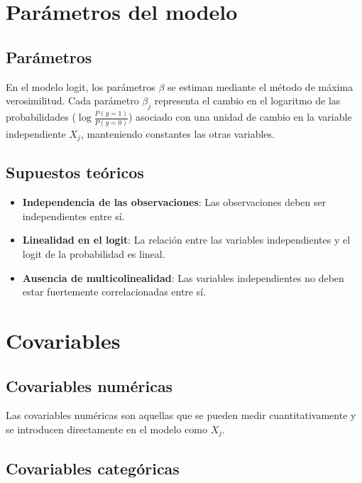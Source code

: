 \documentclass[
  letterpaper,
  DIV=11,
  numbers=noendperiod]{scrreprt}
\providecommand{\tightlist}{%
  \setlength{\itemsep}{0pt}\setlength{\parskip}{0pt}}\usepackage{longtable,booktabs,array}
\begin{document}
\section{Parámetros del modelo}\label{paruxe1metros-del-modelo}

\subsection{Parámetros}\label{paruxe1metros-1}

En el modelo logit, los parámetros \(\beta\) se estiman mediante el
método de máxima verosimilitud. Cada parámetro \(\beta_j\) representa el
cambio en el logaritmo de las probabilidades
(\(\log \frac{P(y=1)}{P(y=0)}\)) asociado con una unidad de cambio en la
variable independiente \(X_j\), manteniendo constantes las otras
variables.

\subsection{Supuestos teóricos}\label{supuestos-teuxf3ricos-2}

\begin{itemize}
\tightlist
\item
  \textbf{Independencia de las observaciones}: Las observaciones deben
  ser independientes entre sí.
\item
  \textbf{Linealidad en el logit}: La relación entre las variables
  independientes y el logit de la probabilidad es lineal.
\item
  \textbf{Ausencia de multicolinealidad}: Las variables independientes
  no deben estar fuertemente correlacionadas entre sí.
\end{itemize}

\section{Covariables}\label{covariables-1}

\subsection{Covariables numéricas}\label{covariables-numuxe9ricas-1}

Las covariables numéricas son aquellas que se pueden medir
cuantitativamente y se introducen directamente en el modelo como
\(X_j\).

\subsection{Covariables categóricas}\label{covariables-categuxf3ricas-1}
\end{document}
